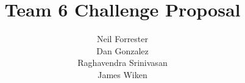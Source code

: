 \documentclass[letterpaper,12pt]{article}
\title{Team 6 Challenge Proposal}
\author{Neil Forrester\\Dan Gonzalez\\Raghavendra Srinivasan\\James Wiken}
\begin{document}
\begin{singlespacing}
\maketitle
\thispagestyle{empty}
\newpage

\tableofcontents
\listoffigures
\listoftables
\thispagestyle{empty}
\newpage

\end{singlespacing}

\setcounter{page}{1}
\end{document}
